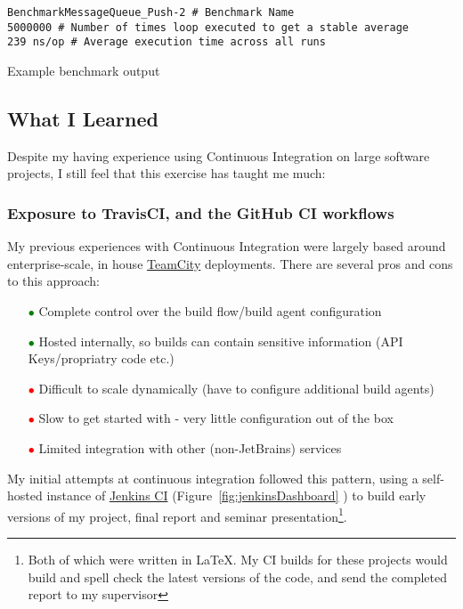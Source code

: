 \begin{listing}
  \centering
  \begin{verbatim}
BenchmarkMessageQueue_Push-2 # Benchmark Name
5000000 # Number of times loop executed to get a stable average
239 ns/op # Average execution time across all runs
  \end{verbatim}
  \caption{Example benchmark output}
  \label{lst:goBenchmarkOutput}
\end{listing}

\subsection{What I Learned}
\label{sub:What I Learned}

Despite my having experience using Continuous Integration on large software
projects, I still feel that this exercise has taught me much:

\subsubsection{Exposure to TravisCI, and the GitHub CI workflows}
\label{subs:Exposure to TravisCI, and the GitHub CI workflows}

My previous experiences with Continuous Integration were largely based around
enterprise-scale, in house \href{https://www.jetbrains.com/teamcity/}{TeamCity}
deployments. There are several pros and cons to this approach:

\begin{itemize}
  \item[\textcolor{green}{$\bullet$}] Complete control over the build flow/build agent configuration
  \item[\textcolor{green}{$\bullet$}] Hosted internally, so builds can contain
  sensitive information (API Keys/propriatry code etc.)
  \item[\textcolor{red}{$\bullet$}] Difficult to scale dynamically
  (have to configure additional build agents)
  \item[\textcolor{red}{$\bullet$}] Slow to get started with - very little
  configuration out of the box
  \item[\textcolor{red}{$\bullet$}] Limited integration with other (non-JetBrains)
  services
\end{itemize}

My initial attempts at continuous integration followed this pattern, using
a self-hosted instance of \href{http://jenkins-ci.org/}{Jenkins CI}
(Figure~\ref{fig:jenkinsDashboard} ) to build early versions of my project,
final report and seminar presentation\footnote{Both of which were written in
\LaTeX. My CI builds for these projects would build and spell check the latest
versions of the code, and send the completed report to my
supervisor}.


